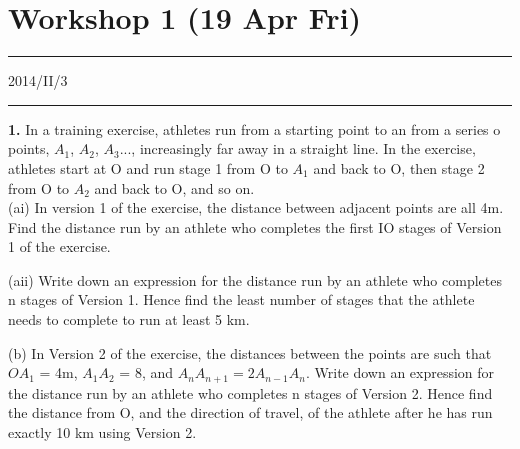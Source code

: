 \documentclass{article}
\begin{document}
\section{Workshop 1 (19 Apr Fri)}

  \vspace{4pt}
    \hrule
  \vspace{4pt}
2014/II/3
\vspace{4pt}
    \hrule
  \vspace{4pt}

\hfill \break

\noindent
\textbf{1.} In a training exercise, athletes run from a starting point
to an from a series o points, $A_1$, $A_2$, $A_3$..., increasingly far away in a straight line. In the exercise, athletes start at O and run stage 1 from O to $A_1$ and back to O, then stage 2 from O to $A_2$ and back to O, and so on. \\

(ai) In version 1 of the exercise, the distance between adjacent points are all 4m. Find the distance run by an athlete who completes the first IO stages of Version 1 of the exercise.
\begin{flushright} [2m] \end{flushright} 


(aii) Write down an expression for the distance run by an athlete who completes n stages of Version 1. Hence find the least number of stages that the athlete needs to complete to run at least 5 km.
\begin{flushright} [4m] \end{flushright} 


(b) In Version 2 of the exercise, the distances between the points are such that $OA_1$ = 4m, $A_1A_2$ = 8, and $A_nA_{n+1} = 2A_{n-1}A_n$. Write down an expression for the distance run by an athlete who completes n stages of Version 2. Hence find the distance from O, and the direction of travel, of the athlete after he has run exactly 10 km using Version 2. \begin{flushright} [5m] \end{flushright} 
\end{document}
